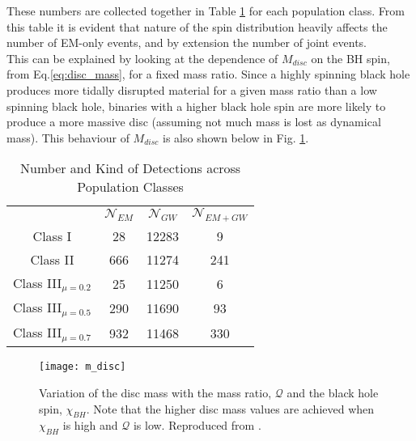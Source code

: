     These numbers are collected together in Table \ref{tab:popln_numbers} for each
    population class. From this table it is evident that nature of the spin distribution
    heavily affects the number of EM-only events, and by extension the number of joint
    events.\\
    This can be explained by looking at the dependence of $M_{disc}$ on the BH
    spin, from Eq.\ref{eq:disc_mass}, for a fixed mass ratio. Since a highly spinning
    black hole produces more tidally disrupted material for a given mass ratio than a
    low spinning black hole, binaries with a higher black hole spin are more likely to
    produce a more massive disc (assuming not much mass is lost as dynamical mass).
    This behaviour of $M_{disc}$ is also shown below in Fig. \ref{fig:m_disc}.

    \begin{table}[H]
        \centering
        \caption{Number and Kind of Detections across Population Classes}
        \begin{tabular}{cccc}
            \toprule

                &
            $\mathcal{N}_{EM}$ &
            $\mathcal{N}_{GW}$ &
            $\mathcal{N}_{EM+GW}$ \\

            Class I & 28 & 12283 & 9 \\

            Class II & 666 & 11274 & 241 \\

            Class III$_{\mu = 0.2}$ &
            25 & 11250 & 6 \\
            Class III$_{\mu = 0.5}$ &
            290 & 11690 & 93 \\
            Class III$_{\mu = 0.7}$ &
            932 & 11468 & 330 \\
            \bottomrule
        \end{tabular}
        \label{tab:popln_numbers}
    \end{table}


    \begin{figure}[H]
        \centering
        \texttt{[image: m\_disc]}
        \caption[Variation of $M_{\mathrm{disc}}$ with $\chi_{BH}$ and $\mathcal{Q}$]{
            Variation of the disc mass with the mass ratio, $\mathcal{Q}$ and the black
            hole spin, $\chi_{BH}$. Note that the higher disc mass values are achieved
            when $\chi_{BH}$ is high and $\mathcal{Q}$ is low. Reproduced from
            \cite{barbieri_2019b}.
        }
        \label{fig:m_disc}
    \end{figure}

